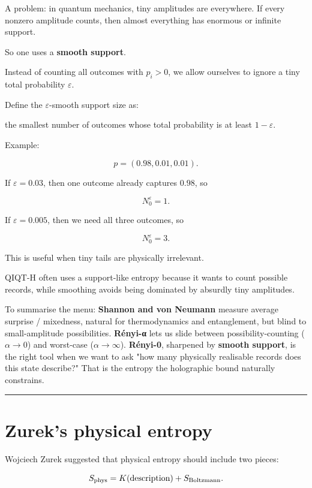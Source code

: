 \documentclass[11pt,a4paper]{article}
\newenvironment{qiqtquote}{\begin{mdframed}[style=quotestyle]}{\end{mdframed}}
\begin{document}
A problem: in quantum mechanics, tiny amplitudes are everywhere. If every nonzero amplitude counts, then almost everything has enormous or infinite support.

So one uses a \textbf{smooth support}.

Instead of counting all outcomes with $p_i>0$, we allow ourselves to ignore a tiny total probability $\varepsilon$.

Define the $\varepsilon$-smooth support size as:

\begin{qiqtquote}
the smallest number of outcomes whose total probability is at least $1-\varepsilon$.
\end{qiqtquote}

Example:

\[
p=(0.98,0.01,0.01).
\]

If $\varepsilon=0.03$, then one outcome already captures $0.98$, so

\[
N_0^\varepsilon=1.
\]

If $\varepsilon=0.005$, then we need all three outcomes, so

\[
N_0^\varepsilon=3.
\]

This is useful when tiny tails are physically irrelevant.

QIQT-H often uses a support-like entropy because it wants to count possible records, while smoothing avoids being dominated by absurdly tiny amplitudes.

To summarise the menu: \textbf{Shannon and von Neumann} measure average surprise / mixedness, natural for thermodynamics and entanglement, but blind to small-amplitude possibilities. \textbf{Rényi-α} lets us slide between possibility-counting ($\alpha \to 0$) and worst-case ($\alpha \to \infty$). \textbf{Rényi-0}, sharpened by \textbf{smooth support}, is the right tool when we want to ask "how many physically realisable records does this state describe?" That is the entropy the holographic bound naturally constrains.

\medskip\hrule\medskip

\section{Zurek’s physical entropy}

Wojciech Zurek suggested that physical entropy should include two pieces:

\[
S_{\rm phys} = K(\text{description}) + S_{\rm Boltzmann}.
\]
\end{document}
